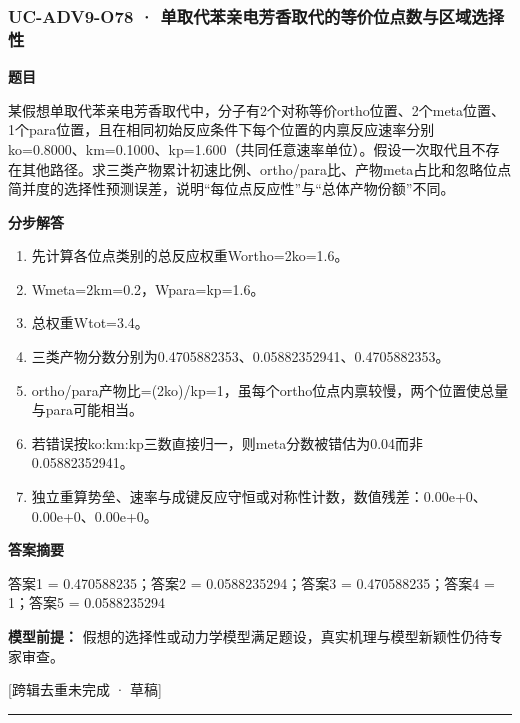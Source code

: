 \documentclass[UTF8,11pt,a4paper]{ctexart}
\begin{document}
\subsubsection*{UC-ADV9-O78 · 单取代苯亲电芳香取代的等价位点数与区域选择性}
\noindent\textbf{题目}\par
某假想单取代苯亲电芳香取代中，分子有2个对称等价ortho位置、2个meta位置、1个para位置，且在相同初始反应条件下每个位置的内禀反应速率分别ko=0.8000、km=0.1000、kp=1.600（共同任意速率单位）。假设一次取代且不存在其他路径。求三类产物累计初速比例、ortho/para比、产物meta占比和忽略位点简并度的选择性预测误差，说明“每位点反应性”与“总体产物份额”不同。\par
\medskip\noindent\textbf{分步解答}
\begin{enumerate}
\item 先计算各位点类别的总反应权重Wortho=2ko=1.6。
\item Wmeta=2km=0.2，Wpara=kp=1.6。
\item 总权重Wtot=3.4。
\item 三类产物分数分别为0.4705882353、0.05882352941、0.4705882353。
\item ortho/para产物比=(2ko)/kp=1，虽每个ortho位点内禀较慢，两个位置使总量与para可能相当。
\item 若错误按ko:km:kp三数直接归一，则meta分数被错估为0.04而非0.05882352941。
\item 独立重算势垒、速率与成键反应守恒或对称性计数，数值残差：0.00e+0、0.00e+0、0.00e+0。
\end{enumerate}
\noindent\textbf{答案摘要}\par
答案1 = 0.470588235；答案2 = 0.0588235294；答案3 = 0.470588235；答案4 = 1；答案5 = 0.0588235294\par
\noindent\textbf{模型前提：}
假想的选择性或动力学模型满足题设，真实机理与模型新颖性仍待专家审查。\par
\noindent\textcolor{red!65!black}{[跨辑去重未完成 · 草稿]} \par
\medskip\hrule\medskip
{}
\end{document}
